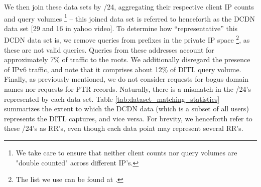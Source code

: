 \documentclass[sigconf,nonacm,10pt]{acmart}
\begin{document}
\begin{table}[]
\centering
{}
\caption{Statistics displaying the extent to which the RR's of users in a large CDN represent RR's seen in the 2018 DITL captures. Also shown is the extent to which RR's of RIPE probes represent the 2018 DITL captures.}
\label{tab:dataset_matching_statistics}
\end{table}

We then join these data sets by /24, aggregating their respective client
IP counts and query volumes
\footnote{We take care to ensure that neither client counts nor query volumes are "double counted" across different IP's.}
-- this joined data set is referred to henceforth as the DCDN data set
{[}29 and 16 in yahoo video{]}. To determine how ``representative'' this
DCDN data set is, we remove queries from prefixes in the private IP
space
\footnote{ The list we use can be found at \cite{private_ip_space}.}, as
these are not valid queries. Queries from these addresses account for
approximately 7\% of traffic to the roots. We additionally disregard the
presence of IPv6 traffic, and note that it comprises about 12\% of DITL
query volume. Finally, as previously mentioned, we do not consider
requests for bogus domain names nor requests for PTR records. Naturally,
there is a mismatch in the /24's represented by each data set. Table
\ref{tab:dataset_matching_statistics} summarizes the extent to which the
DCDN data (which is a subset of all users) represents the DITL captures,
and vice versa. For brevity, we henceforth refer to these /24's as RR's,
even though each data point may represent several RR's.
\end{document}
